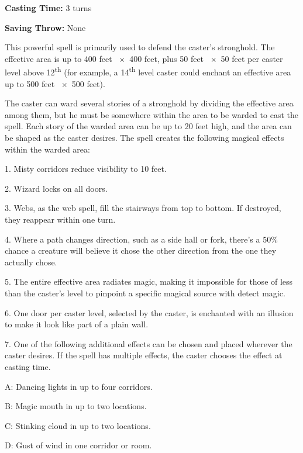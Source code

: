 \begin{multicols}{2}
\begin{minipage}{\columnwidth}
\noindent \textbf{Casting Time:} 3 turns

\noindent \textbf{Saving Throw:} None

\end{minipage}

This powerful spell is primarily used to defend the caster's stronghold.  The effective area is up to 400 feet ~$\times$~400 feet, plus 50 feet ~$\times$~50 feet per caster level above 12\textsuperscript{th} (for example, a 14\textsuperscript{th} level caster could enchant an effective area up to 500 feet ~$\times$~500 feet).  

The caster can ward several stories of a stronghold by dividing the effective area among them, but he must be somewhere within the area to be warded to cast the spell.  Each story of the warded area can be up to 20 feet high, and the area can be shaped as the caster desires.  The spell creates the following magical effects within the warded area:

1. Misty corridors reduce visibility to 10 feet.

2. Wizard locks on all doors.

3. Webs, as the web spell, fill the stairways from top to bottom.  If destroyed, they reappear within one turn.

4. Where a path changes direction, such as a side hall or fork, there's a 50\% chance a creature will believe it chose the other direction from the one they actually chose.

5. The entire effective area radiates magic, making it impossible for those of less than the caster's level to pinpoint a specific magical source with detect magic.

6. One door per caster level, selected by the caster, is enchanted with an illusion to make it look like part of a plain wall.

7. One of the following additional effects can be chosen and placed wherever the caster desires.  If the spell has multiple effects, the caster chooses the effect at casting time. 

\hspace{1em}A: Dancing lights in up to four corridors.

\hspace{1em}B: Magic mouth in up to two locations.

\hspace{1em}C: Stinking cloud in up to two locations.

\hspace{1em}D: Gust of wind in one corridor or room.


\end{multicols}
